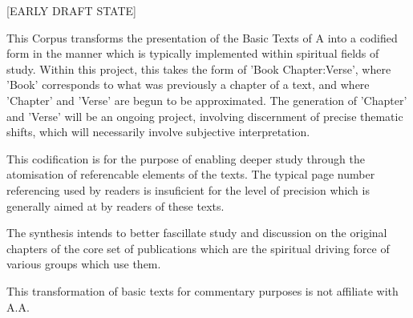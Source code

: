 \begin{fmatterchapter}


[EARLY DRAFT STATE]

This Corpus transforms the presentation of the Basic Texts of A 
    into a codified form 
    in the manner which is typically implemented 
    within spiritual fields of study.
Within this project, this takes the form of 'Book Chapter:Verse', 
    where 'Book' corresponds to what was previously a chapter of a text, 
    and where 'Chapter' and 'Verse' are begun to be approximated.
The generation of 'Chapter' and 'Verse' will be an ongoing project,
    involving discernment of precise thematic shifts,
    which will necessarily involve subjective interpretation.

This codification is for the purpose of enabling deeper study 
    through the atomisation of referencable elements of the texts. 
The typical page number referencing used by readers 
    is insuficient for the level of precision 
    which is generally aimed at by readers of these texts.

The synthesis intends to better fascillate study and discussion 
    on the original chapters of the core set of publications 
    which are the spiritual driving force of various groups which use them.

This transformation of basic texts for commentary purposes 
    is not affiliate with A.A.

\end{fmatterchapter}
